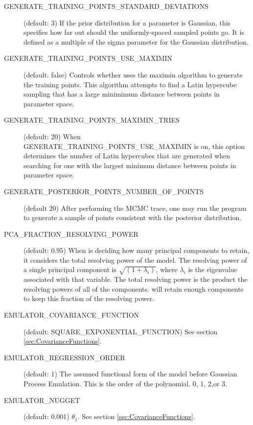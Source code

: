 \begin{description}
    \item[GENERATE\_TRAINING\_POINTS\_STANDARD\_DEVIATIONS] (default: 3) If the prior distribution for a parameter is Gaussian, this specifies how far out should the uniformly-spaced sampled points go. It is defined as a multiple of the sigma parameter for the Gaussian distribution.

    \item[GENERATE\_TRAINING\_POINTS\_USE\_MAXIMIN] (default: false) Controls whether  uses the maximin algorithm to generate the training points. This algorithm attempts to find a Latin hypercube sampling that has a large minimimum distance between points in parameter space.

    \item[GENERATE\_TRAINING\_POINTS\_MAXIMIN\_TRIES] (default: 20) When \newline GENERATE\_TRAINING\_POINTS\_USE\_MAXIMIN is on, this option determines the number of Latin hypercubes that are generated when searching for one with the largest minimum distance between points in parameter space.

    \item[GENERATE\_POSTERIOR\_POINTS\_NUMBER\_OF\_POINTS] (default 20) After performing the MCMC trace, one may run the program  to generate a sample of points consistent with the posterior distribution.

    \item[PCA\_FRACTION\_RESOLVING\_POWER] (default: 0.95)  When  is deciding how many principal components to retain, it considers the total resolving power of the model. The resolving power of a single principal component is $\sqrt{(1 + \lambda_i)}$, where $\lambda_i$ is the eigenvalue associated with that variable. The total resolving power is the product the resolving powers of all of the components.  will retain enough components to keep this fraction of the resolving power.

    \item[EMULATOR\_COVARIANCE\_FUNCTION] (default: SQUARE\_EXPONENTIAL\_FUNCTION) See section \ref{sec:CovarianceFunctions}.

    \item[EMULATOR\_REGRESSION\_ORDER] (default: 1) The assumed functional form of the model before Gaussian Process Emulation. This is the order of the polynomial. 0, 1, 2,or 3.

    \item[EMULATOR\_NUGGET] (default: 0.001) $\theta_1$. See section \ref{sec:CovarianceFunctions}.


\end{description}
